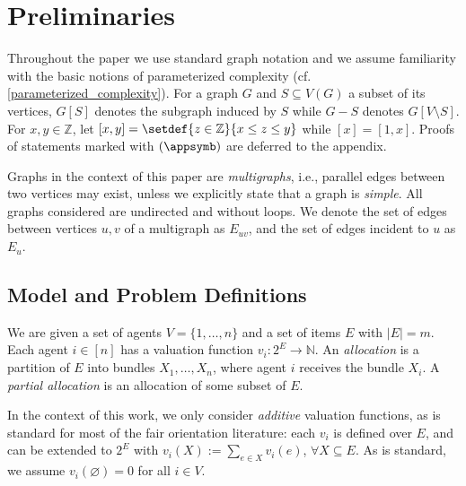 \documentclass[11pt,letterpaper]{article}
\begin{document}
\section{Preliminaries}\label{sec:preliminaries}






Throughout the paper we use standard graph notation \cite{books/Diestel17}
and we assume familiarity with the basic notions of parameterized complexity (cf. \cref{parameterized_complexity}). %
For a graph $G$ and $S \subseteq V(G)$ a subset of its vertices,
$G[S]$ denotes the subgraph induced by $S$ while $G - S$ denotes $G[V \setminus S]$.
For $x, y \in \mathbb{Z}$, let $[x, y] = \setdef{z \in \mathbb{Z}}{x \leq z \leq y}$ while $[x] = [1,x]$.
Proofs of statements marked with $(\appsymb)$ are deferred to the appendix.

Graphs in the context of this paper are \emph{multigraphs}, i.e., parallel edges between two vertices may exist, unless we explicitly state that a graph is \emph{simple}. All graphs considered are undirected and without loops.
We denote the set of edges between vertices $u,v$ of a multigraph as $E_{uv}$, and the set of edges incident to $u$ as $E_u$.






\subsection{Model and Problem Definitions}

We are given a set of agents $V=\{1,\ldots,n\}$ and a set of items $E$ with $|E|=m$. Each agent $i \in [n]$ has a valuation function $v_i \colon 2^E \to \mathbb{N}$. An \emph{allocation} is a partition of $E$ into bundles $X_1,\ldots,X_n$, where agent $i$ receives the bundle $X_i$. A \emph{partial allocation} is an allocation of some subset of $E$. 

In the context of this work, we only consider \emph{additive} valuation functions, as is standard for most of the fair orientation literature:
each $v_i$ is defined over $E$, and can be extended to $2^E$ with $v_i(X):=\sum_{e\in X}v_i(e)$, $\forall X\subseteq E$. As is standard, we assume $v_i(\varnothing)=0$ for all $i\in V$.
\end{document}
